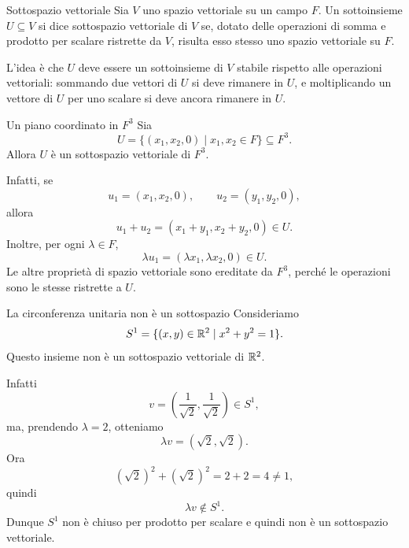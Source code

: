 \documentclass[a4paper]{article}
\begin{document}
\begin{snippetdefinition}{Sottospazio vettoriale}
    Sia \(V\) uno spazio vettoriale su un campo \(F\). Un sottoinsieme \(U\subseteq V\) si dice sottospazio vettoriale di \(V\) se, dotato delle operazioni di somma e prodotto per scalare ristrette da \(V\), risulta esso stesso uno spazio vettoriale su \(F\).
\end{snippetdefinition}

L'idea è che \(U\) deve essere un sottoinsieme di \(V\) stabile rispetto alle operazioni vettoriali: sommando due vettori di \(U\) si deve rimanere in \(U\), e moltiplicando un vettore di \(U\) per uno scalare si deve ancora rimanere in \(U\).

\begin{snippetexample}{Un piano coordinato in \(F^3\)}
    Sia
    \[
        U=\{(x_1,x_2,0)\mid x_1,x_2\in F\}\subseteq F^3.
    \]
    Allora \(U\) è un sottospazio vettoriale di \(F^3\).

    Infatti, se
    \[
        u_1=(x_1,x_2,0),
        \qquad
        u_2=(y_1,y_2,0),
    \]
    allora
    \[
        u_1+u_2
        =
        (x_1+y_1,x_2+y_2,0)\in U.
    \]
    Inoltre, per ogni \(\lambda\in F\),
    \[
        \lambda u_1
        =
        (\lambda x_1,\lambda x_2,0)\in U.
    \]
    Le altre proprietà di spazio vettoriale sono ereditate da \(F^3\), perché le operazioni sono le stesse ristrette a \(U\).
\end{snippetexample}

\begin{snippetexample}{La circonferenza unitaria non è un sottospazio}
    Consideriamo
    \[
        S^1=\{(x,y)\in\mathbb{R}^2\mid x^2+y^2=1\}.
    \]
    Questo insieme non è un sottospazio vettoriale di \(\mathbb{R}^2\).

    Infatti
    \[
        v=\left(\frac{1}{\sqrt{2}},\frac{1}{\sqrt{2}}\right)\in S^1,
    \]
    ma, prendendo \(\lambda=2\), otteniamo
    \[
        \lambda v
        =
        \left(\sqrt{2},\sqrt{2}\right).
    \]
    Ora
    \[
        (\sqrt{2})^2+(\sqrt{2})^2=2+2=4\neq 1,
    \]
    quindi
    \[
        \lambda v\notin S^1.
    \]
    Dunque \(S^1\) non è chiuso per prodotto per scalare e quindi non è un sottospazio vettoriale.
    \begin{center}
    \end{center}
\end{snippetexample}
\end{document}
